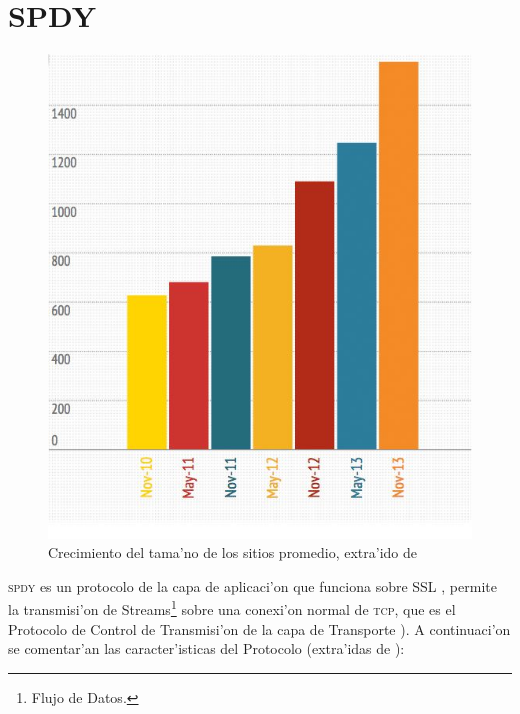 \documentclass[a4paper,11pt,twocolumn]{article}
\begin{document}
\section{SPDY}
\begin{figure}[h!]
  	\centering
	\includegraphics[scale=0.4]{151tammy}
	\caption{\small Crecimiento del tama'no de los sitios promedio, extra'ido de \cite{tammy}}
	\label{average}
\end{figure}
\textsc{spdy}\cite{SPDYWhitepaper} es un protocolo de la capa de aplicaci'on \cite{illustratedTCPIP} que funciona sobre SSL \cite{rfcSSL}, permite la transmisi'on de Streams\footnote{Flujo de Datos.} sobre una conexi'on normal de \textsc{tcp}, que es el Protocolo de Control de Transmisi'on de la capa de Transporte \cite{illustratedTCPIP}). A continuaci'on se comentar'an las caracter'isticas del Protocolo (extra'idas de \cite{SPDYWhitepaper}):
\end{document}
